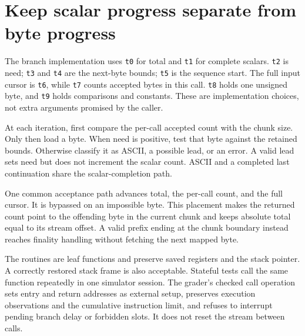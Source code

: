 \section{Keep scalar progress separate from byte progress}
The branch implementation uses \texttt{t0} for total and \texttt{t1} for complete
scalars. \texttt{t2} is need; \texttt{t3} and \texttt{t4} are the next-byte bounds;
\texttt{t5} is the sequence start. The full input cursor is \texttt{t6}, while
\texttt{t7} counts accepted bytes in this call. \texttt{t8} holds one unsigned
byte, and \texttt{t9} holds comparisons and constants. These are implementation
choices, not extra arguments promised by the caller.

At each iteration, first compare the per-call accepted count with the chunk size.
Only then load a byte. When need is positive, test that byte against the retained
bounds. Otherwise classify it as ASCII, a possible lead, or an error. A valid lead
sets need but does not increment the scalar count. ASCII and a completed last
continuation share the scalar-completion path.

One common acceptance path advances total, the per-call count, and the full cursor.
It is bypassed on an impossible byte. This placement makes the returned count point
to the offending byte in the current chunk and keeps absolute total equal to its
stream offset. A valid prefix ending at the chunk boundary instead reaches finality
handling without fetching the next mapped byte.

The routines are leaf functions and preserve saved registers and the stack pointer.
A correctly restored stack frame is also acceptable. Stateful tests call the same
function repeatedly in one simulator session. The grader's checked call operation
sets entry and return addresses as external setup, preserves execution observations
and the cumulative instruction limit, and refuses to interrupt pending branch delay
or forbidden slots. It does not reset the stream between calls.
